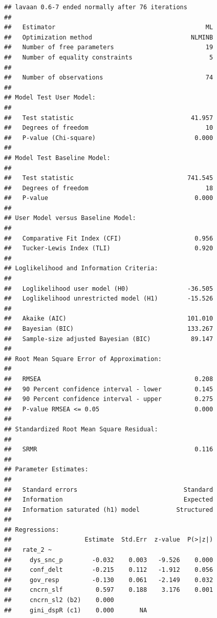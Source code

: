 \documentclass[
]{article}
\begin{document}
\begin{verbatim}
## lavaan 0.6-7 ended normally after 76 iterations
## 
##   Estimator                                         ML
##   Optimization method                           NLMINB
##   Number of free parameters                         19
##   Number of equality constraints                     5
##                                                       
##   Number of observations                            74
##                                                       
## Model Test User Model:
##                                                       
##   Test statistic                                41.957
##   Degrees of freedom                                10
##   P-value (Chi-square)                           0.000
## 
## Model Test Baseline Model:
## 
##   Test statistic                               741.545
##   Degrees of freedom                                18
##   P-value                                        0.000
## 
## User Model versus Baseline Model:
## 
##   Comparative Fit Index (CFI)                    0.956
##   Tucker-Lewis Index (TLI)                       0.920
## 
## Loglikelihood and Information Criteria:
## 
##   Loglikelihood user model (H0)                -36.505
##   Loglikelihood unrestricted model (H1)        -15.526
##                                                       
##   Akaike (AIC)                                 101.010
##   Bayesian (BIC)                               133.267
##   Sample-size adjusted Bayesian (BIC)           89.147
## 
## Root Mean Square Error of Approximation:
## 
##   RMSEA                                          0.208
##   90 Percent confidence interval - lower         0.145
##   90 Percent confidence interval - upper         0.275
##   P-value RMSEA <= 0.05                          0.000
## 
## Standardized Root Mean Square Residual:
## 
##   SRMR                                           0.116
## 
## Parameter Estimates:
## 
##   Standard errors                             Standard
##   Information                                 Expected
##   Information saturated (h1) model          Structured
## 
## Regressions:
##                    Estimate  Std.Err  z-value  P(>|z|)
##   rate_2 ~                                            
##     dys_snc_p        -0.032    0.003   -9.526    0.000
##     conf_delt        -0.215    0.112   -1.912    0.056
##     gov_resp         -0.130    0.061   -2.149    0.032
##     cncrn_slf         0.597    0.188    3.176    0.001
##     cncrn_sl2 (b2)    0.000                           
##     gini_dspR (c1)    0.000       NA                  

\end{verbatim}
\end{document}
